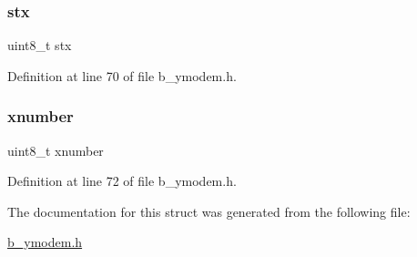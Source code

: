 \mbox{\label{structb_ymodem1k_info__t_a0016500d356f9144ad98cf2db5243a70}} 
\subsubsection{\texorpdfstring{stx}{stx}}
{\footnotesize\ttfamily uint8\+\_\+t stx}



Definition at line 70 of file b\+\_\+ymodem.\+h.

\mbox{\label{structb_ymodem1k_info__t_ae817be61f4d69f01a76ff417b23f5a54}} 
\subsubsection{\texorpdfstring{xnumber}{xnumber}}
{\footnotesize\ttfamily uint8\+\_\+t xnumber}



Definition at line 72 of file b\+\_\+ymodem.\+h.



The documentation for this struct was generated from the following file\+:\begin{DoxyCompactItemize}
\item 
\mbox{\hyperlink{b__ymodem_8h}{b\+\_\+ymodem.\+h}}\end{DoxyCompactItemize}
